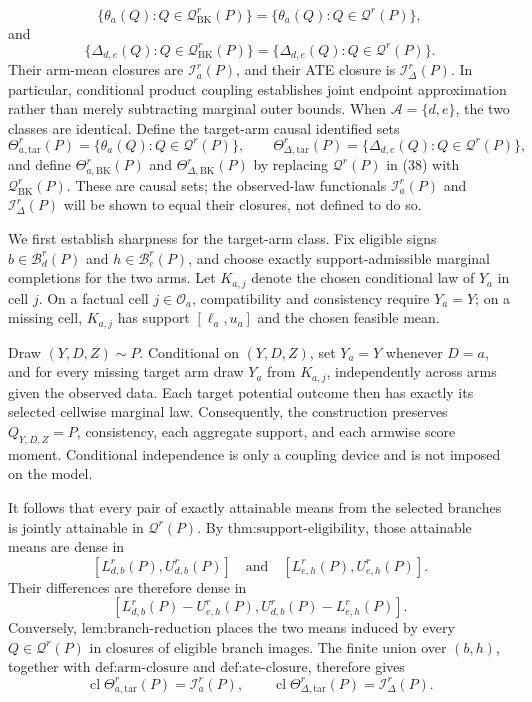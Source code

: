 \[
 \{\theta_a(Q):Q\in\mathcal Q_{\mathrm{BK}}^r(P)\}
 =\{\theta_a(Q):Q\in\mathcal Q^r(P)\},
\]
and
\[
 \{\Delta_{d,e}(Q):Q\in\mathcal Q_{\mathrm{BK}}^r(P)\}
 =\{\Delta_{d,e}(Q):Q\in\mathcal Q^r(P)\}.
\]
Their arm-mean closures are \(\mathcal I_a^r(P)\), and their ATE closure is \(\mathcal I_\Delta^r(P)\).  In particular, conditional product coupling establishes joint endpoint approximation rather than merely subtracting marginal outer bounds.  When \(\mathcal A=\{d,e\}\), the two classes are identical.
Define the target-arm causal identified sets
\[
 \Theta_{a,\mathrm{tar}}^r(P)
 =\{\theta_a(Q):Q\in\mathcal Q^r(P)\},\qquad
 \Theta_{\Delta,\mathrm{tar}}^r(P)
 =\{\Delta_{d,e}(Q):Q\in\mathcal Q^r(P)\},                       \tag{38}
\]
and define \(\Theta_{a,\mathrm{BK}}^r(P)\) and \(\Theta_{\Delta,\mathrm{BK}}^r(P)\) by replacing \(\mathcal Q^r(P)\) in (38) with \(\mathcal Q_{\mathrm{BK}}^r(P)\).  These are causal sets; the observed-law functionals \(\mathcal I_a^r(P)\) and \(\mathcal I_\Delta^r(P)\) will be shown to equal their closures, not defined to do so.

We first establish sharpness for the target-arm class.  Fix eligible signs \(b\in\mathcal B_d^r(P)\) and \(h\in\mathcal B_e^r(P)\), and choose exactly support-admissible marginal completions for the two arms.  Let \(K_{a,j}\) denote the chosen conditional law of \(Y_a\) in cell \(j\).  On a factual cell \(j\in\mathcal O_a\), compatibility and consistency require \(Y_a=Y\); on a missing cell, \(K_{a,j}\) has support \([\ell_a,u_a]\) and the chosen feasible mean.

Draw \((Y,D,Z)\sim P\).  Conditional on \((Y,D,Z)\), set \(Y_a=Y\) whenever \(D=a\), and for every missing target arm draw \(Y_a\) from \(K_{a,j}\), independently across arms given the observed data.  Each target potential outcome then has exactly its selected cellwise marginal law.  Consequently, the construction preserves \(Q_{Y,D,Z}=P\), consistency, each aggregate support, and each armwise score moment.  Conditional independence is only a coupling device and is not imposed on the model.

It follows that every pair of exactly attainable means from the selected branches is jointly attainable in \(\mathcal Q^r(P)\).  By \(\text{thm:support-eligibility}\), those attainable means are dense in
\[
 [L_{d,b}^r(P),U_{d,b}^r(P)]
 \quad\text{and}\quad
 [L_{e,h}^r(P),U_{e,h}^r(P)].
\]
Their differences are therefore dense in
\[
 [L_{d,b}^r(P)-U_{e,h}^r(P),
   U_{d,b}^r(P)-L_{e,h}^r(P)].                                  \tag{39}
\]
Conversely, \(\text{lem:branch-reduction}\) places the two means induced by every \(Q\in\mathcal Q^r(P)\) in closures of eligible branch images.  The finite union over \((b,h)\), together with \(\text{def:arm-closure}\) and \(\text{def:ate-closure}\), therefore gives
\[
 \operatorname{cl}\Theta_{a,\mathrm{tar}}^r(P)=\mathcal I_a^r(P),
 \qquad
 \operatorname{cl}\Theta_{\Delta,\mathrm{tar}}^r(P)=\mathcal I_\Delta^r(P). \tag{19a}
\]

